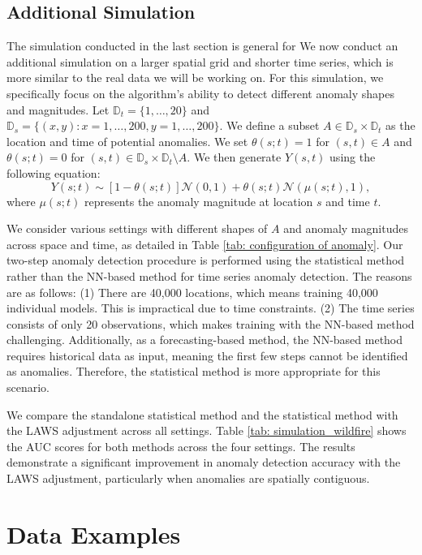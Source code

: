 \documentclass[11pt]{article}
\begin{document}
\subsection{Additional Simulation}
The simulation conducted in the last section is general for We now conduct an additional simulation on a larger spatial grid and shorter time series, which is more similar to the real data we will be working on. For this simulation, we specifically focus on the algorithm's ability to detect different anomaly shapes and magnitudes. Let $\mathbb{D}_t = \{1, \ldots, 20\}$ and $\mathbb{D}_s = \{(x,y): x=1,\ldots,200, y=1,\ldots,200\}$. We define a subset $A \in \mathbb{D}_s \times \mathbb{D}_t$ as the location and time of potential anomalies. We set $\theta(s;t) = 1$ for $(s,t) \in A$ and $\theta(s;t) = 0$ for $(s,t) \in \mathbb{D}_s \times \mathbb{D}_t \setminus A$. We then generate $Y(s,t)$ using the following equation:
\begin{equation}
	Y(s;t) \sim [1-\theta(s;t)]\mathcal{N}(0, 1) + \theta(s;t)\mathcal{N}(\mu(s;t),1),
\end{equation}
where $\mu(s;t)$ represents the anomaly magnitude at location $s$ and time $t$.

We consider various settings with different shapes of $A$ and anomaly magnitudes across space and time, as detailed in Table \ref{tab: configuration of anomaly}. Our two-step anomaly detection procedure is performed using the statistical method rather than the NN-based method for time series anomaly detection. The reasons are as follows: (1) There are 40,000 locations, which means training 40,000 individual models. This is impractical due to time constraints. (2) The time series consists of only 20 observations, which makes training with the NN-based method challenging. Additionally, as a forecasting-based method, the NN-based method requires historical data as input, meaning the first few steps cannot be identified as anomalies. Therefore, the statistical method is more appropriate for this scenario.

We compare the standalone statistical method and the statistical method with the LAWS adjustment across all settings. Table \ref{tab: simulation_wildfire} shows the AUC scores for both methods across the four settings. The results demonstrate a significant improvement in anomaly detection accuracy with the LAWS adjustment, particularly when anomalies are spatially contiguous.






\section{Data Examples}\label{sec: real data analysis}
\end{document}
